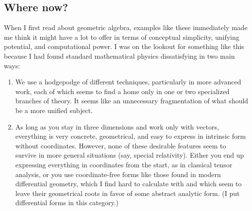 \documentclass{utarticle}
\begin{document}
\subsection{Where now?}
\label{wherenow}

When I first read about geometric algebra, examples like these immediately
made me think it might have a lot to offer in terms of conceptual simplicity, 
unifying potential, and computational power.  I was on the lookout for something
like this because I had found standard mathematical physics dissatisfying in
two main ways:
\begin{enumerate}
\item We use a hodgepodge of different techniques, particularly in more advanced
          work, each of which seems to find a home only in one or two specialized 
          branches of theory.  It seems like an unnecessary fragmentation of what should 
          be a more unified subject.
\item As long as you stay in three dimensions and work only with vectors, 
          everything is very concrete, geometrical, and easy to express in intrinsic form without 
          coordinates.  However, none of these desirable features seem to survive in more 
          general situations (say, special relativity).  Either you end up expressing everything 
          in coordinates from the start, as in classical tensor analysis, or you use coordinate-free
          forms like those found in modern differential geometry, which I find hard to calculate
          with and which seem to leave their geometrical roots in favor of some abstract analytic 
          form.  (I put differential forms in this category.)
\end{enumerate}
\end{document}
